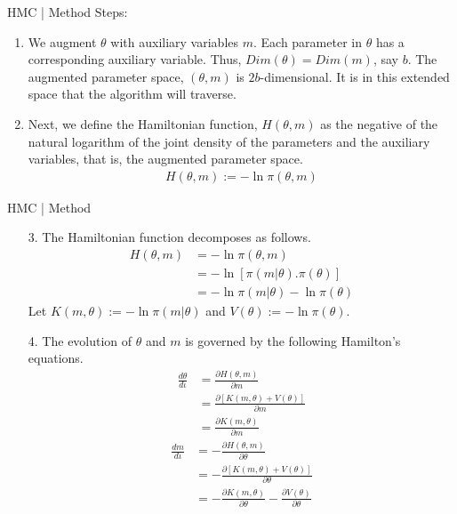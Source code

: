 \documentclass[11pt]{beamer}
\begin{document}
\begin{frame}{HMC | Method}
Steps:
\begin{enumerate}
 \item We augment $\theta$ with auxiliary variables $m$. Each parameter in $\theta$ has a corresponding auxiliary variable. Thus, $Dim(\theta) = Dim(m)$, say $b$. The augmented parameter space, $(\theta, m)$ is $2b$-dimensional. It is in this extended space that the algorithm will traverse.
 \item Next, we define the Hamiltonian function, $H(\theta, m)$ as the negative of the natural logarithm of the joint density of the parameters and the auxiliary variables, that is, the augmented parameter space.
 \begin{align}
H(\theta, m) := - \ln \pi(\theta, m)
\end{align}
\end{enumerate}



\end{frame}

\begin{frame}{HMC | Method}

\begin{enumerate}
 \item[3.] The Hamiltonian function decomposes as follows. 
\begin{align}
H(\theta, m) &= - \ln \pi(\theta, m) \\ \nonumber
&= - \ln [\pi(m | \theta). \pi(\theta)] \\ \nonumber
&= -\ln \pi(m | \theta) - \ln \pi(\theta)
\end{align}
Let $K(m, \theta) := -\ln \pi(m | \theta)$ and $V(\theta) := - \ln \pi(\theta)$. 
 
\end{enumerate}



\end{frame}

\begin{frame}
\begin{enumerate}
\item[4.] The evolution of $\theta$ and $m$ is governed by the following Hamilton's equations.
\begin{align}
\frac{d\theta}{d\iota} &= \frac{\partial H(\theta, m)}{\partial m} \\ \nonumber
&= \frac{\partial[K(m, \theta) + V(\theta)]}{\partial m} \\ \nonumber
&= \frac{\partial K(m, \theta)}{\partial m}
\end{align}
\begin{align}
\frac{d m}{d \iota} &= - \frac{\partial H(\theta, m)}{\partial \theta} \\ \nonumber
&= - \frac{\partial[K(m, \theta) + V(\theta)]}{\partial \theta} \\ \nonumber
&= - \frac{\partial K(m, \theta)}{\partial \theta} - \frac{\partial V(\theta)}{\partial \theta}
\end{align}
\end{enumerate}
\end{frame}
\end{document}
